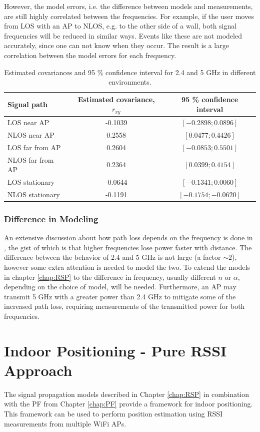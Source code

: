 \documentclass{LTHthesis}
\begin{document}
However, the model errors, i.e. the difference between models and measurements, are still highly correlated between the frequencies. For example, if the user moves from LOS with an AP to NLOS, e.g. to the other side of a wall, both signal frequencies will be reduced in similar ways. Events like these are not modeled accurately, since one can not know when they occur. The result is a large correlation between the model errors for each frequency.
%
\begin{table}
\begin{center}
\begin{tabular}{|l|c|c|}
\hline
Signal path & Estimated covariance, $r_{xy}$ & 95 \% confidence interval \\
\hline
\hline
LOS near AP& -0.1039 & $[-0.2898;0.0896]$ \\
\hline
NLOS near AP& 0.2558 & $[0.0477;0.4426]$  \\
\hline
LOS far from AP& 0.2604 & $[-0.0853;0.5501]$\\
\hline
NLOS far from AP& 0.2364& $[0.0399; 0.4154]$ \\
\hline
LOS stationary  &-0.0644 & $[-0.1341;0.0060]$ \\
\hline
NLOS stationary  & -0.1191 &$[-0.1754;-0.0620]$ \\
\hline
\end{tabular}
\end{center}
\caption{Estimated covariances and 95 \% confidence interval for 2.4 and 5 GHz in different environments.}\label{corr_conf}
\end{table}
%
\subsection{Difference in Modeling}
%
An extensive discussion about how path loss depends on the frequency is done in \cite{rappaport96}, the gist of which is that higher frequencies lose power faster with distance. The difference between the behavior of 2.4 and 5 GHz is not large (a factor $\sim 2$), however some extra attention is needed to model the two. To extend the models in chapter \ref{chap:RSP} to the difference in frequency, usually different $n$ or $\alpha$, depending on the choice of model, will be needed. Furthermore, an AP may transmit 5 GHz with a greater power than 2.4 GHz to mitigate some of the increased path loss, requiring measurements of the transmitted power for both frequencies.  
%
\chapter{Indoor Positioning - Pure RSSI Approach}
\label{chap:pure_rssi}
%
The signal propagation models described in Chapter \ref{chap:RSP} in combination with the PF from Chapter \ref{chap:PF} provide a framework for indoor positioning. This framework can be used to perform position estimation using RSSI measurements from multiple WiFi APs. 
\end{document}
